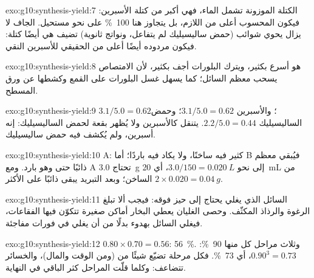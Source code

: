 \begin{solution}{exo:g10:synthesis-yield:7}
الكتلة الموزونة تشمل الماء، فهي أكبر من كتلة الأسبرين: فيكون  المحسوب
أعلى من اللازم، بل يتجاوز هنا \qty{100}{\percent} على نحو مستحيل.  الجاف لا يزال يحوي شوائب (حمض ساليسيليك لم يتفاعل، ونواتج ثانوية) تضيف
هي أيضًا كتلة: فيكون مردوده أيضًا أعلى من  الحقيقي للأسبرين
النقي.
\end{solution}

\begin{solution}{exo:g10:synthesis-yield:8}
هو أسرع بكثير، ويترك البلورات أجف بكثير، لأن الامتصاص يسحب معظم السائل؛
كما يسهل غسل البلورات على القمع وكشطها عن ورق 
المسطح.
\end{solution}

\begin{solution}{exo:g10:synthesis-yield:9}
 $3.1/5.0 = 0.62$؛ والأسبرين $3.1/5.0 = 0.62$؛ وحمض الساليسيليك
$2.2/5.0 = 0.44$.  يتنقل كالأسبرين ولا يُظهر بقعة لحمض الساليسيليك:
إنه أسبرين، ولم يُكشف فيه حمض ساليسيليك.
\end{solution}

\begin{solution}{exo:g10:synthesis-yield:10}
 A:  كثير  فيه ساخنًا، ولا يكاد  فيه باردًا؛ أما  B
فيُبقي معظم  ذائبًا حتى وهو بارد. ومع A تحتاج \qty{3.0}{g} إلى نحو
$3.0 / 150 = \qty{0.020}{L}$، أي \qty{20}{mL} من  الساخن؛ وبعد التبريد
يبقى ذائبًا على الأكثر $2 \times 0.020 = \qty{0.04}{g}$.
\end{solution}

\begin{solution}{exo:g10:synthesis-yield:11}
السائل الذي يغلي يحتاج إلى حيز فوقه: فيجب ألا تبلغ الرغوة والرذاذ المكثّف.
وحصى الغليان يعطي البخار أماكن صغيرة تتكوّن فيها الفقاعات، فيغلي السائل بهدوء
بدلًا من أن يغلي في فورات مفاجئة.
\end{solution}

\begin{solution}{exo:g10:synthesis-yield:12}
$0.80 \times 0.70 = 0.56$: \qty{56}{\percent}. وثلاث مراحل  كل منها
\qty{90}{\percent}: $0.90^3 = 0.73$، أي \qty{73}{\percent}. فكل مرحلة تضيّع
شيئًا من  (ومن الوقت والمال)، والخسائر تتضاعف: وكلما قلّت المراحل كثر
 الباقي في النهاية.
\end{solution}

